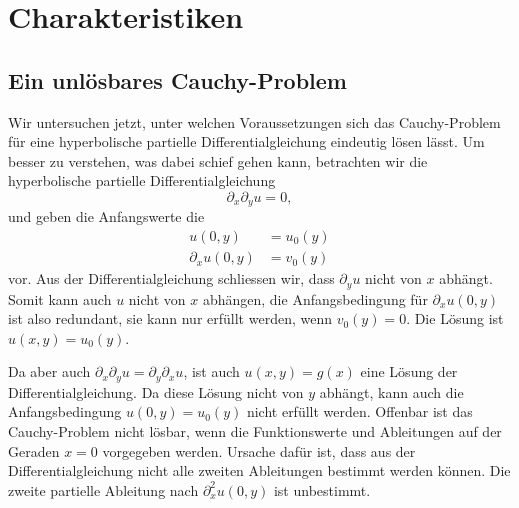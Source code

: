 \section{Charakteristiken}
\subsection{Ein unlösbares Cauchy-Problem}
Wir untersuchen jetzt, unter welchen Voraussetzungen sich das Cauchy-Problem
für eine hyperbolische partielle Differentialgleichung eindeutig lösen lässt.
Um besser zu verstehen, was dabei schief gehen kann, betrachten wir die
hyperbolische partielle Differentialgleichung
\[
\partial_x\partial_y u=0,
\]
und geben die Anfangswerte die
\begin{align*}
u(0,y)&=u_0(y)
\\
\partial_xu(0,y)&=v_0(y)
\end{align*}
vor.
Aus der Differentialgleichung schliessen wir, dass $\partial_y u$
nicht von $x$ abhängt. Somit kann auch $u$ nicht von $x$ abhängen,
die Anfangsbedingung für $\partial_xu(0,y)$ ist also redundant,
sie kann nur erfüllt werden, wenn $v_0(y)=0$.
Die Lösung ist $u(x,y)=u_0(y)$.

Da aber auch $\partial_x\partial_yu=\partial_y\partial_xu$, ist auch
$u(x,y)=g(x)$ eine Lösung der Differentialgleichung. Da diese
Lösung nicht von $y$ abhängt, kann auch die Anfangsbedingung $u(0,y)=u_0(y)$
nicht erfüllt werden. Offenbar ist das Cauchy-Problem nicht lösbar, wenn die
Funktionswerte und Ableitungen auf der Geraden $x=0$ vorgegeben werden.
Ursache dafür ist, dass aus der Differentialgleichung nicht alle zweiten
Ableitungen bestimmt werden können. Die zweite partielle Ableitung
nach $\partial_x^2u(0,y)$ ist unbestimmt.

